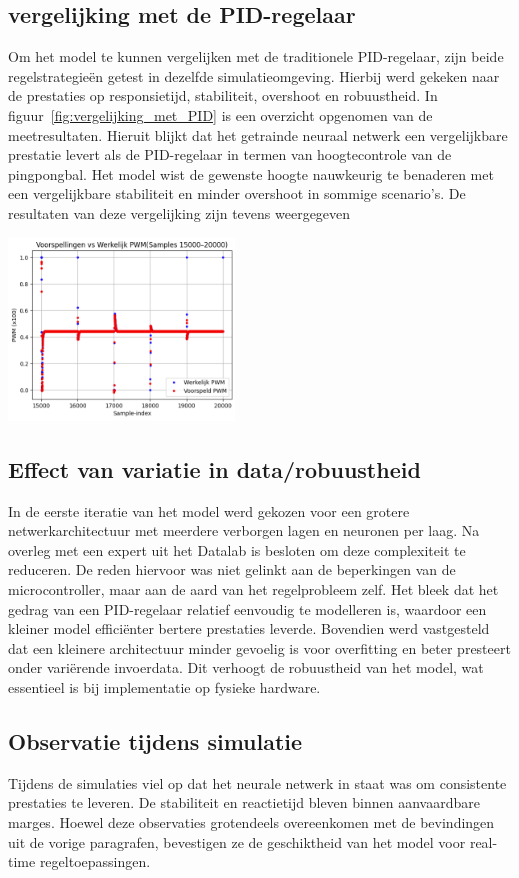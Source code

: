 \subsection{vergelijking met de PID-regelaar}
Om het model te kunnen vergelijken met de traditionele PID-regelaar, zijn beide regelstrategieën getest in dezelfde simulatieomgeving. Hierbij werd gekeken naar de prestaties op responsietijd, stabiliteit, overshoot en robuustheid. In figuur~\ref{fig:vergelijking_met_PID} is een overzicht opgenomen van de meetresultaten. Hieruit blijkt dat het getrainde neuraal netwerk een vergelijkbare prestatie levert als de PID-regelaar in termen van hoogtecontrole van de pingpongbal. Het model wist de gewenste hoogte nauwkeurig te benaderen met een vergelijkbare stabiliteit en minder overshoot in sommige scenario’s. De resultaten van deze vergelijking zijn tevens weergegeven 

\begin{center}
\centering
\includegraphics[width=0.45\textwidth]{./afbeeldingen/vergelijking.png}
\label{fig:vergelijking_met_PID}
\end{center}


\subsection{Effect van variatie in data/robuustheid}
In de eerste iteratie van het model werd gekozen voor een grotere netwerkarchitectuur met meerdere verborgen lagen en neuronen per laag. Na overleg met een expert uit het Datalab is besloten om deze complexiteit te reduceren. De reden hiervoor was niet gelinkt aan de beperkingen van de microcontroller, maar aan de aard van het regelprobleem zelf. Het bleek dat het gedrag van een PID-regelaar relatief eenvoudig te modelleren is, waardoor een kleiner model efficiënter bertere prestaties leverde.
Bovendien werd vastgesteld dat een kleinere architectuur minder gevoelig is voor overfitting en beter presteert onder variërende invoerdata. Dit verhoogt de robuustheid van het model, wat essentieel is bij implementatie op fysieke hardware.

\subsection{Observatie tijdens simulatie}
Tijdens de simulaties viel op dat het neurale netwerk in staat was om consistente prestaties te leveren. De stabiliteit en reactietijd bleven binnen aanvaardbare marges. Hoewel deze observaties grotendeels overeenkomen met de bevindingen uit de vorige paragrafen, bevestigen ze de geschiktheid van het model voor real-time regeltoepassingen.



